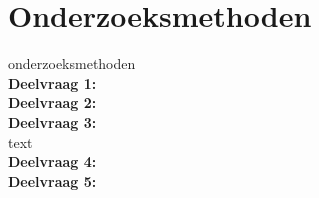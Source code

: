 \section{Onderzoeksmethoden}
onderzoeksmethoden\\
\textbf{Deelvraag 1:} \textit{\SubquestionOne}\\

\textbf{Deelvraag 2:} \textit{\SubquestionTwo} \\

\textbf{Deelvraag 3:} \textit{\SubquestionThree} \\
text\\ 
\textbf{Deelvraag 4:} \textit{\SubquestionFour} \\

\textbf{Deelvraag 5:} \textit{\SubquestionFive} \\
